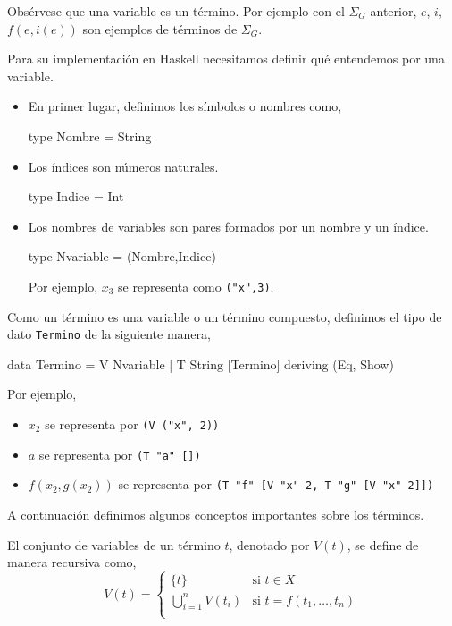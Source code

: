 Obsérvese que una variable es un término.  Por ejemplo con el $\Sigma_G$
anterior, $e$, $i$, $f(e,i(e))$ son ejemplos de términos de $\Sigma_G$.

Para su implementación en Haskell necesitamos definir qué
entendemos por una variable. 

\begin{itemize}

\item En primer lugar, definimos los símbolos o nombres como,
\begin{codigo}
type Nombre = String
\end{codigo}

\item Los índices son números naturales.

\begin{codigo}
type Indice = Int
\end{codigo}

\item Los nombres de variables son pares formados por un nombre y un índice.
\begin{codigo}
type Nvariable = (Nombre,Indice)
\end{codigo}
Por ejemplo, $x_3$ se representa como \texttt{("x",3)}.

\end{itemize}

Como un término es una variable o un término compuesto, definimos el
tipo de dato \texttt{Termino} de la siguiente manera,
\begin{codigo}
data Termino = V Nvariable
             | T String [Termino]
             deriving (Eq, Show)
\end{codigo}

Por ejemplo,
\begin{itemize}
\item $x_2$ se representa por \texttt{(V ("x", 2))}
\item $a$ se representa por \texttt{(T "a" [])}
\item $f(x_2,g(x_2))$ se representa por \texttt{(T "f" [V "x" 2, T "g"
    [V "x" 2]])}
\end{itemize}

A continuación definimos algunos conceptos importantes sobre los
términos.\begin{defi} El conjunto de variables de un término $t$, denotado por
  $V(t)$, se define de manera recursiva como,
  \begin{equation*}
    V(t)=
    \left\lbrace
      \begin{array}{ll}
        \{ t \} & \text{si } t \in X \\
        \displaystyle \bigcup^n_{i=1} V(t_i) & \text{si } t = f(t_1, \dots, t_n)\\
      \end{array}
    \right.
  \end{equation*}
\end{defi}

